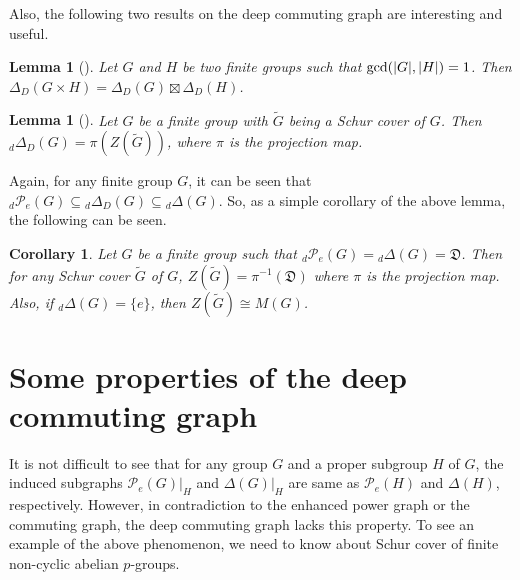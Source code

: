 \documentclass[12pt,a4paper]{article}
\newtheorem{lemma}[theorem]{Lemma}
\newtheorem{corollary}[theorem]{Corollary}
\begin{document}
Also, the following two results on the deep commuting graph are interesting and useful.

\begin{lemma}[{\rm\cite[Proposition 6.1(c)]{cameron}}]\label{strong_product}
Let $G$ and $H$ be two finite groups such that ${\rm gcd}(|G|,|H|)=1$. Then $\Delta_D(G\times H)=\Delta_D(G)\boxtimes\Delta_D(H)$.   
\end{lemma}

\begin{lemma}[{\rm\cite[Theorem 9.1(c)]{cameron}}]\label{dominant_center}
Let $G$ be a finite group with $\tilde{G}$ being a Schur cover of $G$. Then $_d\Delta_D(G)=\pi(Z(\tilde{G}))$, where $\pi$ is the projection map.
\end{lemma}

Again, for any finite group $G$, it can be seen that ${_d}\mathcal{P}_e(G)\subseteq{_d}\Delta_D(G)\subseteq{_d}\Delta(G)$. So, as a simple corollary of the above lemma, the following can be seen.
\begin{corollary}\label{center_schur_cover}
    Let $G$ be a finite group such that ${_d}\mathcal{P}_e(G)={_d}\Delta(G)=\mathfrak{D}$. Then for any Schur cover $\tilde{G}$ of $G$, $Z(\tilde{G})=\pi^{-1}(\mathfrak{D})$ where $\pi$ is the projection map. Also, if ${_d}\Delta(G)=\{e\}$, then $Z(\tilde{G})\cong M(G)$.
\end{corollary}

\section{Some properties of the deep commuting graph}\label{Some properties of the deep commuting graph}

It is not difficult to see that for any group $G$ and a proper subgroup $H$ of $G$, the induced subgraphs $\mathcal{P}_e(G)\vert_H$ and $\Delta(G)\vert_H$ are same as $\mathcal{P}_e(H)$ and $\Delta(H)$, respectively. However, in contradiction to the enhanced power graph or the commuting graph, the deep commuting graph lacks this property. To see an example of the above phenomenon, we need to know about Schur cover of finite non-cyclic abelian $p$-groups.
\end{document}
